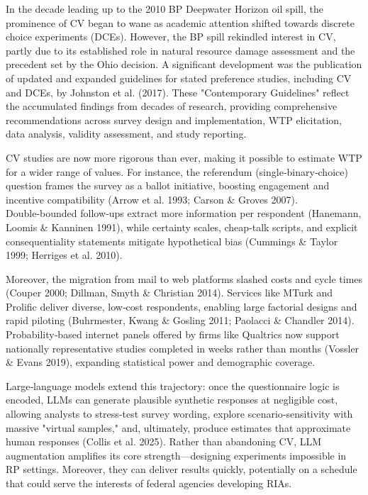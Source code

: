 \documentclass[12pt]{article}
\begin{document}
In the decade leading up to the 2010 BP Deepwater Horizon oil spill, the prominence of CV began to wane as academic attention shifted towards discrete choice experiments (DCEs). However, the BP spill rekindled interest in CV, partly due to its established role in natural resource damage assessment and the precedent set by the Ohio decision. A significant development was the publication of updated and expanded guidelines for stated preference studies, including CV and DCEs, by Johnston et al. (2017). These "Contemporary Guidelines" reflect the accumulated findings from decades of research, providing comprehensive recommendations across survey design and implementation, WTP elicitation, data analysis, validity assessment, and study reporting. 

CV studies are now more rigorous than ever, making it possible to estimate WTP for a wider range of values. For instance, the referendum (single‑binary‑choice) question frames the survey as a ballot initiative, boosting engagement and incentive compatibility (Arrow et al. 1993; Carson \& Groves 2007). Double‑bounded follow‑ups extract more information per respondent (Hanemann, Loomis \& Kanninen 1991), while certainty scales, cheap‑talk scripts, and explicit consequentiality statements mitigate hypothetical bias (Cummings \& Taylor 1999; Herriges et al. 2010).

Moreover, the migration from mail to web platforms slashed costs and cycle times (Couper 2000; Dillman, Smyth \& Christian 2014). Services like MTurk and Prolific deliver diverse, low‑cost respondents, enabling large factorial designs and rapid piloting (Buhrmester, Kwang \& Gosling 2011; Paolacci \& Chandler 2014). Probability‑based internet panels offered by firms like Qualtrics now support nationally representative studies completed in weeks rather than months (Vossler \& Evans 2019), expanding statistical power and demographic coverage.

Large‑language models extend this trajectory: once the questionnaire logic is encoded, LLMs can generate plausible synthetic responses at negligible cost, allowing analysts to stress‑test survey wording, explore scenario‑sensitivity with massive "virtual samples," and, ultimately, produce estimates that approximate human responses (Collis et al. 2025). Rather than abandoning CV, LLM augmentation amplifies its core strength—designing experiments impossible in RP settings. Moreover, they can deliver results quickly, potentially on a schedule that could serve the interests of federal agencies developing RIAs.
\end{document}
